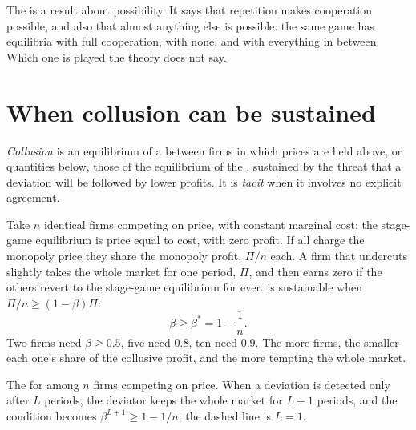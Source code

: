 The  is a result about possibility. It says that repetition makes cooperation possible, and also
that almost anything else is possible: the same game has equilibria with full cooperation, with none, and with
everything in between. Which one is played the theory does not say.

\section{When collusion can be sustained}\label{sec:b2:repeated-games:collusion}

\begin{definition}[Collusion]\label{def:b2:repeated-games:collusion}
\emph{Collusion} is an equilibrium of a  between firms in which prices are held
above, or quantities below, those of the equilibrium of the , sustained by the threat that a deviation
will be followed by lower profits. It is \emph{tacit} when it involves no explicit agreement.
\end{definition}

Take $n$ identical firms competing on price, with constant marginal cost: the stage-game equilibrium is price
equal to cost, with zero profit. If all charge the monopoly price they share the monopoly profit, $\Pi/n$ each. A
firm that undercuts slightly takes the whole market for one period, $\Pi$, and then earns zero if the others
revert to the stage-game equilibrium for ever.  is sustainable when $\Pi/n \ge (1 - \beta)\Pi$:
\[
\beta \ge \beta^* = 1 - \frac{1}{n}.
\]
Two firms need $\beta \ge 0.5$, five need 0.8, ten need 0.9. The more firms, the smaller each one's share of the
collusive profit, and the more tempting the whole market.

\begin{omfigure}

{\small The  for  among $n$ firms competing on price. When a deviation is
detected only after $L$ periods, the deviator keeps the whole market for $L + 1$ periods, and the condition becomes
$\beta^{L + 1} \ge 1 - 1/n$; the dashed line is $L = 1$.}
\end{omfigure}

